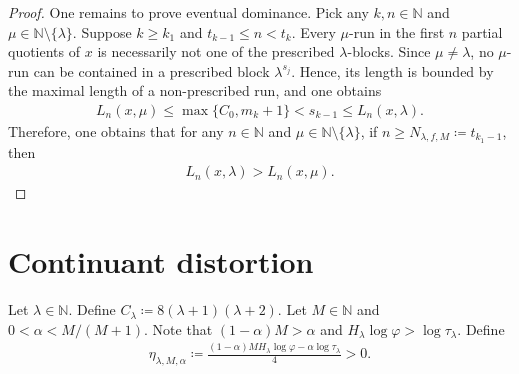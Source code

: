 \documentclass[12pt,reqno]{amsart}
\theoremstyle{definition}
\theoremstyle{plain}
\begin{document}
\begin{proof}
One remains to prove eventual dominance. Pick any $k,n\in\mathbb{N}$ and $\mu\in\mathbb{N}\setminus\{\lambda\}$. Suppose $k\geq k_1$ and $t_{k-1}\leq n< t_k$. Every $\mu$-run in the first $n$ partial quotients of $x$ is necessarily not one of the prescribed $\lambda$-blocks. Since $\mu\neq\lambda$, no $\mu$-run can be contained in a prescribed block $\lambda^{s_j}$. Hence, its length is bounded by the maximal length of a non-prescribed run, and one obtains
\begin{align*}
    L_n(x,\mu)\leq\max{\{C_0,m_k+1\}}<s_{k-1}\leq L_n(x,\lambda).
\end{align*}
Therefore, one obtains that for any $n\in\mathbb N$ and $\mu\in\mathbb{N}\setminus\{\lambda\}$, if $n\geq N_{\lambda,f,M}\coloneqq t_{k_1-1}$, then
\begin{align*}
    L_n(x,\lambda)>L_n(x,\mu).
\end{align*}
\end{proof}

\section{Continuant distortion}

Let $\lambda\in\mathbb{N}$. Define $C_\lambda\coloneqq8(\lambda+1)(\lambda+2)$. Let $M\in\mathbb{N}$ and $0<\alpha<M/(M+1)$. Note that $(1-\alpha)M>\alpha$ and $H_\lambda\log{\varphi}>\log{\tau_\lambda}$. Define
\begin{align*}
    \eta_{\lambda,M,\alpha}
    \coloneqq\frac{(1-\alpha)MH_\lambda\log\varphi-\alpha\log \tau_\lambda}{4}>0.
\end{align*}
\end{document}
